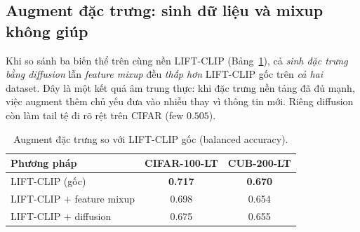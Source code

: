 \subsection{Augment đặc trưng: sinh dữ liệu và mixup không giúp}

Khi so sánh ba biến thể trên cùng nền LIFT-CLIP (Bảng~\ref{tab:augment}), cả \emph{sinh đặc trưng
bằng diffusion} lẫn \emph{feature mixup} đều \emph{thấp hơn} LIFT-CLIP gốc trên \emph{cả hai}
dataset. Đây là một kết quả âm trung thực: khi đặc
trưng nền tảng đã đủ mạnh, việc augment thêm chủ yếu đưa vào nhiễu thay vì thông tin mới. Riêng
diffusion còn làm tail tệ đi rõ rệt trên CIFAR (few $0.505$).

\begin{table}[H]
\centering
\caption{Augment đặc trưng so với LIFT-CLIP gốc (balanced accuracy).}
\label{tab:augment}
\begin{tabular}{lcc}
\toprule
\textbf{Phương pháp} & \textbf{CIFAR-100-LT} & \textbf{CUB-200-LT} \\
\midrule
LIFT-CLIP (gốc) & \textbf{0.717} & \textbf{0.670} \\
LIFT-CLIP $+$ feature mixup & 0.698 & 0.654 \\
LIFT-CLIP $+$ diffusion & 0.675 & 0.655 \\
\bottomrule
\end{tabular}
\end{table}





